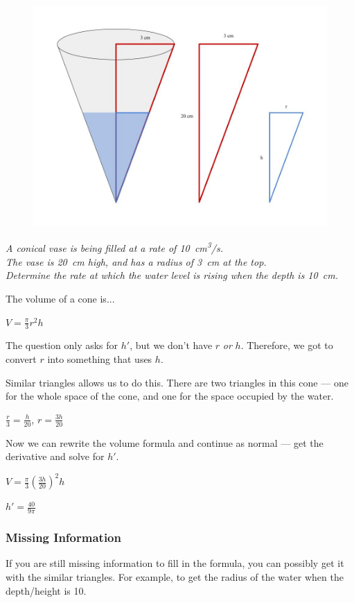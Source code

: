 \documentclass[a4paper,12pt]{article}
\begin{document}
\begin{figure}[H]
    \centering
    \includegraphics[width=\textwidth]{cone}
\end{figure}

\emph{A conical vase is being filled at a rate of \SI{10}{\cm\cubed/\s}.\\The vase is \SI{20}{\cm} high, and has a radius of \SI{3}{\cm} at the top.\\Determine the rate at which the water level is rising when the depth is \SI{10}{\cm}.}

The volume of a cone is...

$V = \frac{\pi}{3}r^2h$

The question only asks for $h'$, but we don't have $r$ \emph{or} $h$. Therefore, we got to convert $r$ into something that uses $h$.

Similar triangles allows us to do this. There are two triangles in this cone --- one for the whole space of the cone, and one for the space occupied by the water.

$\frac{r}{3} = \frac{h}{20}$, $r = \frac{3h}{20}$

Now we can rewrite the volume formula and continue as normal --- get the derivative and solve for $h'$.

$V = \frac{\pi}{3}(\frac{3h}{20})^2h$

$h' = \frac{40}{9\pi}$

\subsubsection{Missing Information}
If you are still missing information to fill in the formula, you can possibly get it with the similar triangles. For example, to get the radius of the water when the depth/height is 10.
\end{document}
